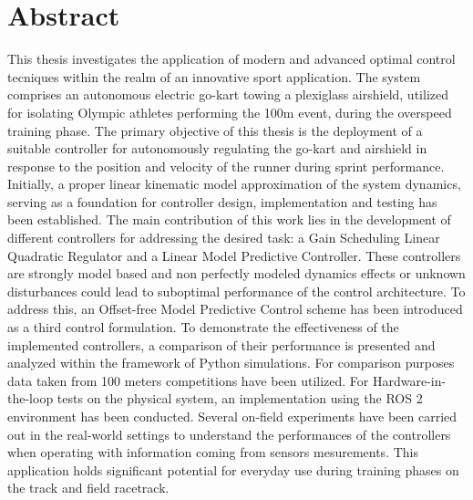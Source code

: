 \documentclass[a4paper,12pt,oneside]{book}
\begin{document}
\vfill

\newpage
\thispagestyle{empty}






\chapter*{Abstract}
This thesis investigates the application of modern and advanced optimal control tecniques within the realm of an innovative sport application. 
The system comprises an autonomous electric go-kart towing a plexiglass airshield, utilized for isolating Olympic athletes performing the 100m event, during the overspeed training phase.
The primary objective of this thesis is the deployment of a suitable controller for autonomously regulating the go-kart and airshield in response to the position and velocity of the runner during sprint performance. 
Initially, a proper linear kinematic model approximation of the system dynamics, serving as a foundation for controller design, implementation and testing has been established.
The main contribution of this work lies in the development of different controllers for addressing the desired task: a Gain Scheduling Linear Quadratic Regulator and a Linear Model Predictive Controller.
These controllers are strongly model based and non perfectly modeled dynamics effects or unknown disturbances could lead to suboptimal performance of the control architecture.
 To address this, an Offset-free Model Predictive Control scheme has been introduced as a third control formulation.
To demonstrate the effectiveness of the implemented controllers, a comparison of their performance is presented and analyzed within the framework of Python simulations. 
For comparison purposes data taken from 100 meters competitions have been utilized.
For Hardware-in-the-loop tests on the physical system, an implementation using the ROS 2 environment has been conducted.
Several on-field experiments have been carried out in the real-world settings to understand the performances of the controllers when operating with information coming from sensors mesurements.
This application holds significant potential for everyday use during training phases on the track and field racetrack.



\tableofcontents
\thispagestyle{empty}
\end{document}
